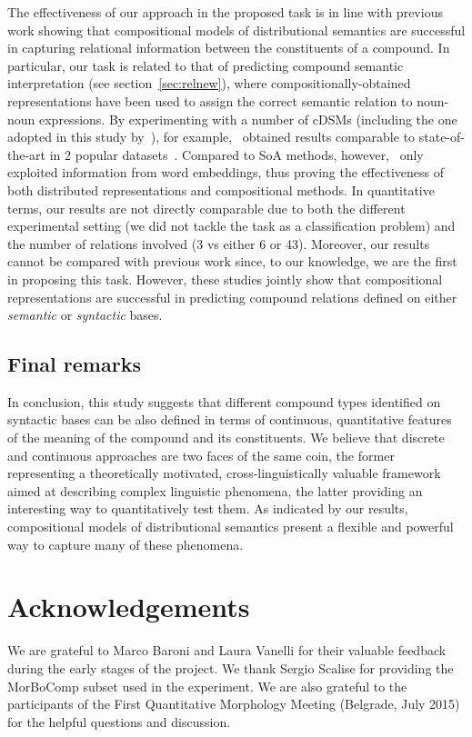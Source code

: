 \documentclass[output=paper]{langsci/langscibook}
\begin{document}
The effectiveness of our approach in the proposed task is in line with previous work showing that compositional models of distributional semantics are successful in capturing relational information between the constituents of a compound. In particular, our task is related to that of predicting compound semantic interpretation (see section~\ref{sec:relnew}), where compositionally-obtained representations have been used to assign the correct semantic relation to noun-noun expressions. By experimenting with a number of cDSMs (including the one adopted in this study by~\citealt{guevara2010}), for example,~\cite{dima2016compositionality} obtained results comparable to state-of-the-art in 2 popular datasets~\citep{o2007annotating,tratz2010taxonomy}. Compared to SoA methods, however,~\cite{dima2016compositionality} only exploited information from word embeddings, thus proving the effectiveness of both distributed representations and compositional methods. In quantitative terms, our results are not directly comparable due to both the different experimental setting (we did not tackle the task as a classification problem) and the number of relations involved (3 vs either 6 or 43). Moreover, our results cannot be compared with previous work since, to our knowledge, we are the first in proposing this task. However, these studies jointly show that compositional  representations are successful in predicting compound relations defined on either \emph{semantic} or \emph{syntactic} bases.


\subsection{Final remarks}

In conclusion, this study suggests that different compound types identified on syntactic bases can be also defined in terms of continuous, quantitative features of the meaning of the compound and its constituents. We believe that discrete and continuous approaches are two faces of the same coin, the former representing a theoretically motivated, cross-linguistically valuable framework aimed at describing complex linguistic phenomena, the latter providing an interesting way to quantitatively test them. As indicated by our results, compositional models of distributional semantics present a flexible and powerful way to capture many of these phenomena.

\section*{Acknowledgements}
We are grateful to Marco Baroni and Laura Vanelli for their valuable feedback during the early stages of the project. We thank Sergio Scalise for providing the MorBoComp subset used in the experiment. We are also grateful to the participants of the First Quantitative Morphology Meeting (Belgrade, July 2015) for the helpful questions and discussion.


{\sloppy\printbibliography[heading=subbibliography,notkeyword=this]}
\end{document}
